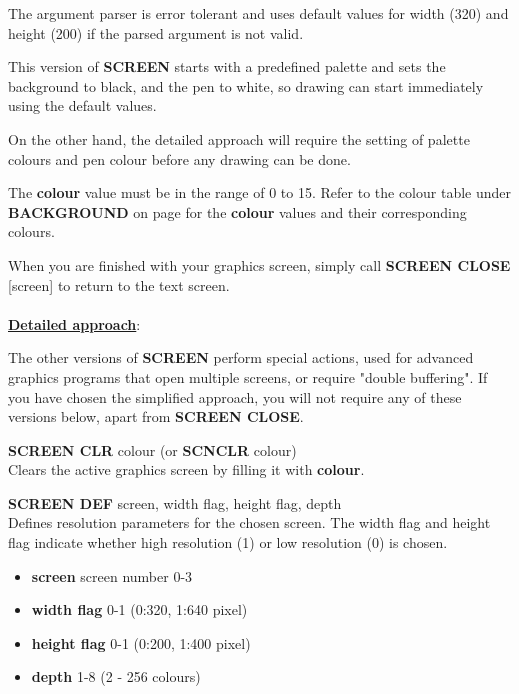 \begin{description}[leftmargin=2cm,style=nextline]
               The argument parser is error tolerant and uses default values
               for width (320) and height (200)
               if the parsed argument is not valid.

               This version of {\bf SCREEN} starts with a predefined
               palette and sets the background to black, and the pen to white,
               so drawing can start immediately using the default values.

               On the other hand, the detailed approach
               will require the setting of palette colours and pen colour
               before any drawing can be done.

               The {\bf colour} value must be in the range of 0 to 15.
               Refer to the colour table under {\bf BACKGROUND} on page
               \pageref{colourtable} for the {\bf colour} values and their corresponding colours.

               When you are finished with your graphics screen, simply call
               {\bf SCREEN CLOSE} [screen] to return to the text screen.
\\
\\
        \underline{{\bf Detailed approach}}:

               The other versions of
               {\bf SCREEN} perform special actions, used for
               advanced graphics programs that open multiple screens,
               or require "double buffering". If you have chosen the simplified
               approach, you will not require any of these versions below,
               apart from {\bf SCREEN CLOSE}.

                {\bf SCREEN CLR} colour (or {\bf SCNCLR} colour) \\
                Clears the active graphics screen by filling it with {\bf colour}.

                {\bf SCREEN DEF} screen, width flag, height flag, depth \\
                Defines resolution parameters for the chosen
                screen. The width flag and height flag indicate
                whether high resolution (1) or low resolution (0) is chosen.

                \begin{itemize}
                  \item {\bf screen} screen number 0-3
                  \item {\bf width flag} 0-1 (0:320, 1:640 pixel)
                  \item {\bf height flag} 0-1 (0:200, 1:400 pixel)
                  \item {\bf depth} 1-8 (2 - 256 colours)
                \end{itemize}


\end{description}
